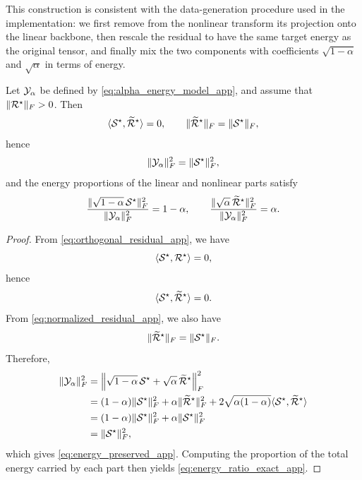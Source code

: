 This construction is consistent with the data-generation procedure used in the implementation: we first remove from the nonlinear transform its projection onto the linear backbone, then rescale the residual to have the same target energy as the original tensor, and finally mix the two components with coefficients $\sqrt{1-\alpha}$ and $\sqrt{\alpha}$ in terms of energy.

\begin{proposition}
\label{prop:alpha_energy_ratio_app}
Let $\mathcal{Y}_\alpha$ be defined by \eqref{eq:alpha_energy_model_app}, and assume that $\|\mathcal{R}^\star\|_F>0$. Then
\begin{equation}
\langle \mathcal{S}^\star,\widetilde{\mathcal{R}}^\star\rangle = 0,
\qquad
\|\widetilde{\mathcal{R}}^\star\|_F = \|\mathcal{S}^\star\|_F,
\end{equation}
hence
\begin{equation}
\|\mathcal{Y}_\alpha\|_F^2=\|\mathcal{S}^\star\|_F^2,
\label{eq:energy_preserved_app}
\end{equation}
and the energy proportions of the linear and nonlinear parts satisfy
\begin{equation}
\frac{\|\sqrt{1-\alpha}\,\mathcal{S}^\star\|_F^2}{\|\mathcal{Y}_\alpha\|_F^2}=1-\alpha,
\qquad
\frac{\|\sqrt{\alpha}\,\widetilde{\mathcal{R}}^\star\|_F^2}{\|\mathcal{Y}_\alpha\|_F^2}=\alpha.
\label{eq:energy_ratio_exact_app}
\end{equation}
\end{proposition}

\begin{proof}
From \eqref{eq:orthogonal_residual_app}, we have
\begin{equation}
\langle \mathcal{S}^\star,\mathcal{R}^\star\rangle=0,
\end{equation}
hence
\begin{equation}
\langle \mathcal{S}^\star,\widetilde{\mathcal{R}}^\star\rangle=0.
\end{equation}
From \eqref{eq:normalized_residual_app}, we also have
\begin{equation}
\|\widetilde{\mathcal{R}}^\star\|_F=\|\mathcal{S}^\star\|_F.
\end{equation}
Therefore,
\begin{align}
\|\mathcal{Y}_\alpha\|_F^2
&=
\left\|
\sqrt{1-\alpha}\,\mathcal{S}^\star+\sqrt{\alpha}\,\widetilde{\mathcal{R}}^\star
\right\|_F^2 \\
&=
(1-\alpha)\|\mathcal{S}^\star\|_F^2
+
\alpha\|\widetilde{\mathcal{R}}^\star\|_F^2
+
2\sqrt{\alpha(1-\alpha)}
\langle \mathcal{S}^\star,\widetilde{\mathcal{R}}^\star\rangle \\
&=
(1-\alpha)\|\mathcal{S}^\star\|_F^2+\alpha\|\mathcal{S}^\star\|_F^2 \\
&=
\|\mathcal{S}^\star\|_F^2,
\end{align}
which gives \eqref{eq:energy_preserved_app}. Computing the proportion of the total energy carried by each part then yields \eqref{eq:energy_ratio_exact_app}.
\end{proof}

